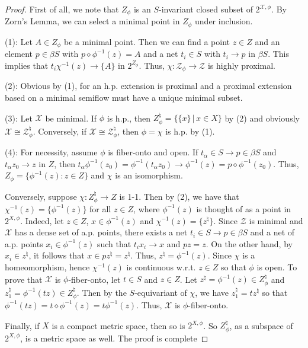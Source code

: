 \documentclass[12pt,final,3p,times]{elsarticle}
\theoremstyle{definition}
\numberwithin{equation}{section}
\begin{document}
\begin{proof}
    First of all, we note that $Z_\phi$ is an $S$-invariant closed subset of $2^{\mathscr{X},\phi}$. By Zorn's Lemma, we can select a minimal point in $Z_\phi$ under inclusion. 
    
(1): Let $A\in Z_\phi$ be a minimal point. Then we can find a point $z\in Z$ and an element $p\in\beta S$ with 
$p\diamond\phi^{-1}(z)=A$ and a net $t_i\in S$ with $t_i\to p$ in $\beta S$. This implies that $t_i\chi^{-1}(z)\to\{A\}$ in $2^{Z_\phi}$. Thus, $\chi\colon \mathscr{Z}_\phi\rightarrow\mathscr{Z}$ is highly proximal.

(2): Obvious by (1), for an h.p. extension is proximal and a proximal extension based on a minimal semiflow must have a unique minimal subset.

(3): Let $\mathscr{X}$ be minimal. If $\phi$ is h.p., then $Z_\phi^\natural=\{\{x\}\,|\,x\in X\}$ by (2) and obviously $\mathscr{X}\cong\mathscr{Z}_\phi^\natural$. Conversely, if $\mathscr{X}\cong\mathscr{Z}_\phi^\natural$, then $\phi=\chi$ is h.p. by (1).

(4): For necessity, assume $\phi$ is fiber-onto and open. If $t_\alpha\in S\to p\in\beta S$ and $t_\alpha z_0\to z$ in $Z$, then
$t_\alpha\phi^{-1}(z_0)=\phi^{-1}(t_\alpha z_0)\to\phi^{-1}(z)=p\diamond\phi^{-1}(z_0)$. Thus, $Z_\phi=\{\phi^{-1}(z)\colon z\in Z\}$ and $\chi$ is an isomorphism. 

Conversely, suppose $\chi\colon Z_\phi^\natural\rightarrow Z$ is 1-1. Then by (2), we have that $\chi^{-1}(z)=\{\phi^{-1}(z)\}$ for all $z\in Z$, where $\phi^{-1}(z)$ is thought of as a point in $2^{X\!,\phi}$.
Indeed, let $z\in Z$, $x\in\phi^{-1}(z)$ and $\chi^{-1}(z)=\{z^\natural\}$. Since $\mathscr{Z}$ is minimal and $\mathscr{X}$ has a dense set of a.p. points, there exists a net $t_i\in S\to p\in\beta S$ and a net of a.p. points $x_i\in\phi^{-1}(z)$ such that $t_ix_i\to x$ and $pz=z$. On the other hand, by $x_i\in z^\natural$, it follows that $x\in pz^\natural=z^\natural$. Thus, $z^\natural=\phi^{-1}(z)$.
Since $\chi$ is a homeomorphism, hence $\chi^{-1}(z)$ is continuous w.r.t. $z\in Z$ so that $\phi$ is open. To prove that $\mathscr{X}$ is $\phi$-fiber-onto, let $t\in S$ and $z\in Z$. Let $z^\natural=\phi^{-1}(z)\in Z_\phi^\natural$ and $z_1^\natural=\phi^{-1}(tz)\in Z_\phi^\natural$. Then by the $S$-equivariant of $\chi$, we have $z_1^\natural=tz^\natural$ so that $\phi^{-1}(tz)=t\diamond\phi^{-1}(z)=t\phi^{-1}(z)$. Thus, $\mathscr{X}$ is $\phi$-fiber-onto.

Finally, if $X$ is a compact metric space, then so is $2^{X,\phi}$. So $Z_\phi^\natural$, as a subspace of $2^{X,\phi}$, is a metric space as well. The proof is complete
\end{proof}
\end{document}

